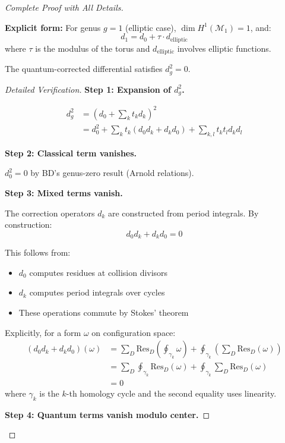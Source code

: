 \begin{proof}[Complete Proof with All Details]
\begin{definition}
\textbf{Explicit form:} For genus $g=1$ (elliptic case), $\dim H^1(\mathcal{M}_1) = 1$, and:
$$d_1 = d_0 + \tau \cdot d_{\text{elliptic}}$$
where $\tau$ is the modulus of the torus and $d_{\text{elliptic}}$ involves elliptic functions.
\end{definition}

\begin{theorem}[Key Property: $d_g^2 = 0$]\label{thm:quantum-diff-squares-zero}
The quantum-corrected differential satisfies $d_g^2 = 0$.
\end{theorem}

\begin{proof}[Detailed Verification]
\textbf{Step 1: Expansion of $d_g^2$.}

\begin{align*}
d_g^2 &= \left(d_0 + \sum_k t_k d_k\right)^2 \\
&= d_0^2 + \sum_k t_k (d_0 d_k + d_k d_0) + \sum_{k,l} t_k t_l d_k d_l
\end{align*}

\textbf{Step 2: Classical term vanishes.}

$d_0^2 = 0$ by BD's genus-zero result (Arnold relations).

\textbf{Step 3: Mixed terms vanish.}

The correction operators $d_k$ are constructed from period integrals. By construction:
$$d_0 d_k + d_k d_0 = 0$$

This follows from:
\begin{itemize}
\item $d_0$ computes residues at collision divisors
\item $d_k$ computes period integrals over cycles
\item These operations commute by Stokes' theorem
\end{itemize}

Explicitly, for a form $\omega$ on configuration space:
\begin{align*}
(d_0 d_k + d_k d_0)(\omega) 
&= \sum_{D} \text{Res}_D \left(\oint_{\gamma_k} \omega\right) + \oint_{\gamma_k} \left(\sum_D \text{Res}_D(\omega)\right) \\
&= \sum_D \oint_{\gamma_k} \text{Res}_D(\omega) + \oint_{\gamma_k} \sum_D \text{Res}_D(\omega) \\
&= 0
\end{align*}
where $\gamma_k$ is the $k$-th homology cycle and the second equality uses linearity.

\textbf{Step 4: Quantum terms vanish modulo center.}


\end{proof}
\end{proof}
